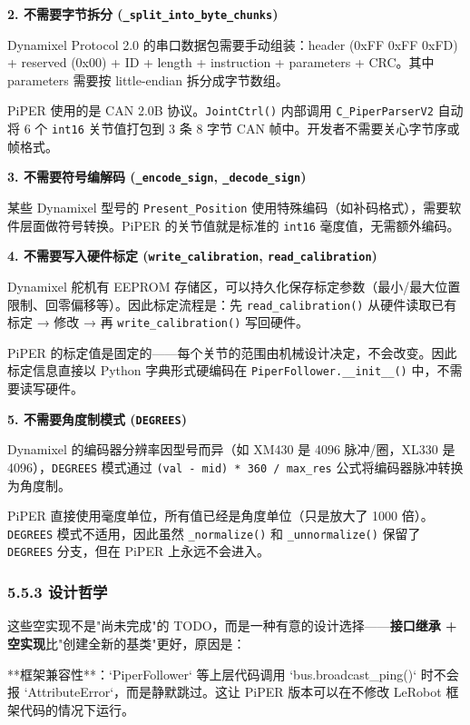 \documentclass[UTF8,a4paper,11pt]{ctexart}
\begin{document}
{\textbf{2. 不需要字节拆分 (\texttt{_split_into_byte_chunks})}

Dynamixel Protocol 2.0 的串口数据包需要手动组装：header (0xFF 0xFF 0xFD) + reserved (0x00) + ID + length + instruction + parameters + CRC。其中 parameters 需要按 little-endian 拆分成字节数组。

PiPER 使用的是 CAN 2.0B 协议。\texttt{JointCtrl()} 内部调用 \texttt{C_PiperParserV2} 自动将 6 个 \texttt{int16} 关节值打包到 3 条 8 字节 CAN 帧中。开发者不需要关心字节序或帧格式。

\textbf{3. 不需要符号编解码 (\texttt{_encode_sign}, \texttt{_decode_sign})}

某些 Dynamixel 型号的 \texttt{Present_Position} 使用特殊编码（如补码格式），需要软件层面做符号转换。PiPER 的关节值就是标准的 \texttt{int16} 毫度值，无需额外编码。

\textbf{4. 不需要写入硬件标定 (\texttt{write_calibration}, \texttt{read_calibration})}

Dynamixel 舵机有 EEPROM 存储区，可以持久化保存标定参数（最小/最大位置限制、回零偏移等）。因此标定流程是：先 \texttt{read_calibration()} 从硬件读取已有标定 → 修改 → 再 \texttt{write_calibration()} 写回硬件。

PiPER 的标定值是固定的——每个关节的范围由机械设计决定，不会改变。因此标定信息直接以 Python 字典形式硬编码在 \texttt{PiperFollower.__init__()} 中，不需要读写硬件。

\textbf{5. 不需要角度制模式 (\texttt{DEGREES})}

Dynamixel 的编码器分辨率因型号而异（如 XM430 是 4096 脉冲/圈，XL330 是 4096），\texttt{DEGREES} 模式通过 \texttt{(val - mid) * 360 / max_res} 公式将编码器脉冲转换为角度制。

PiPER 直接使用毫度单位，所有值已经是角度单位（只是放大了 1000 倍）。\texttt{DEGREES} 模式不适用，因此虽然 \texttt{_normalize()} 和 \texttt{_unnormalize()} 保留了 \texttt{DEGREES} 分支，但在 PiPER 上永远不会进入。

\subsubsection{5.5.3 设计哲学}

这些空实现不是"尚未完成"的 TODO，而是一种有意的设计选择——\textbf{接口继承 + 空实现}比"创建全新的基类"更好，原因是：

\item[1] **框架兼容性**：`PiperFollower` 等上层代码调用 `bus.broadcast_ping()` 时不会报 `AttributeError`，而是静默跳过。这让 PiPER 版本可以在不修改 LeRobot 框架代码的情况下运行。

}
\end{document}
